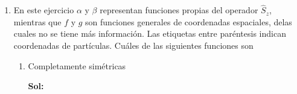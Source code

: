 \documentclass[12pt,a4paper]{article}
\begin{document}
\begin{enumerate}
\begin{enumerate}
    \begin{equation*}
        \hspace{-4cm} =\sum_{m_{s2}} \sum_{m_{s3}} \int \xi_{2}^{*}(r_2) \alpha^{*}(2)  \xi_{3}^{*}(r_2)\beta^*(3) V(2,3) \xi_2(r_2) \alpha(2) \xi_3(r_3) \beta(3) dx_2 dx_3
    \end{equation*}
    
    \begin{equation*}
         -\sum_{m_{s2}} \sum_{m_{s3}} \int  \xi_{2}^{*}(r_2) \alpha^*(2) \xi_{3}^{*}(r_3) \beta^*(3) V(2,3) \xi_2(r_3) \alpha(2) \xi_3(r_2) \beta(1) dx_2 dx_3
    \end{equation*}
    
    \begin{equation*}
        \hspace{-4cm} = \int \xi_{2}^{*}(r_2)   \xi_{3}^{*}(r_3) V(2,3) \xi_2(r_2)  \xi_3(r_3)  dx_2 dx_3 \sum_{m_{s2}} \alpha^{*}(2)\alpha(2)\sum_{m_{s3}}\beta^*(3) \beta(3)
    \end{equation*}
    
    \begin{equation*}
         - \int  \xi_{2}^{*}(r_2)  \xi_{3}^{*}(r_3)  V(2,3) \xi_2(r_3) \xi_3(r_2)  dx_2 dx_3 \sum_{m_{s2}}\alpha^*(2)  \alpha(3) \sum_{m_{s3}} \beta^*(3)\beta(2)
    \end{equation*}
    
    \begin{equation*}
        \hspace{-4cm} <V(2,3)> = \int \xi_{2}^{*}(r_2)   \xi_{3}^{*}(r_3) V(2,3) \xi_2(r_2)  \xi_3(r_3)  dx_2 dx_3 
    \end{equation*}
    
    
    
\end{enumerate}






\item En este ejercicio $\alpha$ y $\beta$ representan funciones propias del operador $\hat{S}_z$, mientras que $f$ y $g$ son funciones generales de coordenadas espaciales, delas cuales no se tiene más información. Las etiquetas entre paréntesis indican coordenadas de partículas. Cuáles de las siguientes funciones son

\begin{enumerate}
    \item Completamente simétricas
    
    \textbf{Sol:}
    

\end{enumerate}
\end{enumerate}
\end{document}
